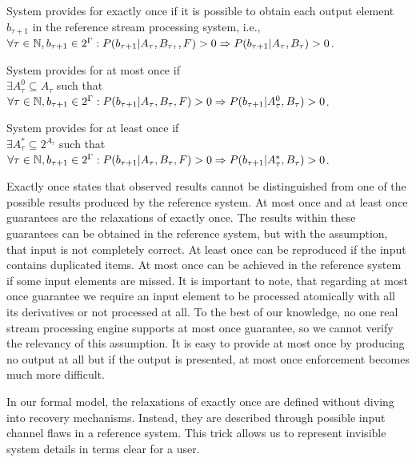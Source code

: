 \begin{definition}{System provides for exactly once}
if it is possible to obtain each output element $b_{\tau+1}$ in the reference stream processing system, i.e.,\\ 
$\forall{\tau \in \mathbb{N}}, b_{\tau+1}\in 2^{\Gamma}: P(b_{\tau+1}|A_{\tau},B_\tau,,F)>0 \Rightarrow \\ P(b_{\tau+1}|A_{\tau},B_\tau)>0$.
\end{definition}

\begin{definition}{System provides for at most once}
if \\
$\exists{A^{0}_{\tau}\subseteq{A_{\tau}}}$ such that \\
$\forall{\tau \in \mathbb{N},{b_{\tau+1}\in 2^{\Gamma}}}: P(b_{\tau+1}|A_{\tau},B_\tau,F)>0 \Rightarrow \\ P(b_{\tau+1}|A^{0}_{\tau},B_\tau)>0$.
\end{definition}

\begin{definition}{System provides for at least once}
if \\
$\exists{A^{*}_{\tau}\subseteq{2^{A_{\tau}}}}$ such that \\
$\forall{\tau \in \mathbb{N}, {b_{\tau+1} \in 2^{\Gamma}}}: P(b_{\tau+1}|A_{\tau},B_\tau,F)>0 \Rightarrow \\ P(b_{\tau+1}|A^{*}_{\tau},B_\tau)>0$.
\end{definition}

Exactly once states that observed results cannot be distinguished from one of the possible results produced by the reference system. At most once and at least once guarantees are the relaxations of exactly once. The results within these guarantees can be obtained in the reference system, but with the assumption, that input is not completely correct. At least once can be reproduced if the input contains duplicated items. At most once can be achieved in the reference system if some input elements are missed. It is important to note, that regarding at most once guarantee we require an input element to be processed atomically with all its derivatives or not processed at all. To the best of our knowledge, no one real stream processing engine supports at most once guarantee, so we cannot verify the relevancy of this assumption. It is easy to provide at most once by producing no output at all but if the output is presented, at most once enforcement becomes much more difficult.  

In our formal model, the relaxations of exactly once are defined without diving into recovery mechanisms. Instead, they are described through possible input channel flaws in a reference system. This trick allows us to represent invisible system details in terms clear for a user.


